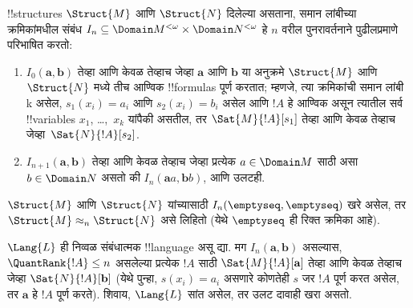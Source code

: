 \documentclass[../../../include/open-logic-section]{subfiles}
\begin{document}
\begin{defn}
  !!{structure}s $\Struct{M}$ आणि $\Struct{N}$ दिलेल्या असताना, समान
  लांबीच्या क्रमिकांमधील संबंध $I_n \subseteq \Domain M^{<\omega}
  \times \Domain N^{<\omega}$ हे $n$ वरील पुनरावर्तनाने पुढीलप्रमाणे
  परिभाषित करतो:
   \begin{enumerate}
   \item $I_0(\mathbf{a},\mathbf{b})$ तेव्हा आणि केवळ तेव्हाच जेव्हा
     $\mathbf{a}$ आणि $\mathbf{b}$ या अनुक्रमे $\Struct{M}$ आणि
     $\Struct{N}$ मध्ये तीच आण्विक !!{formula}s पूर्ण करतात; म्हणजे,
     त्या क्रमिकांची समान लांबी k असेल, $s_1(x_i) = a_i$ आणि $s_2(x_i) =
     b_i$ असेल आणि $!A$ हे आण्विक असून त्यातील सर्व !!{variable}s
     $x_1$, \dots,~$x_k$ यांपैकी असतील, तर $\Sat{M}{!A}[s_1]$ तेव्हा आणि
     केवळ तेव्हाच जेव्हा~$\Sat{N}{!A}[s_2]$.
   \item $I_{n+1} (\mathbf{a},\mathbf{b})$ तेव्हा आणि केवळ तेव्हाच
     जेव्हा प्रत्येक $a\in \Domain M$ साठी असा $b\in \Domain N$ असतो की
     $I_n (\mathbf{a}a,\mathbf{b}b)$, आणि उलटही.
   \end{enumerate}
\end{defn}


\begin{defn}
  $\Struct{M}$ आणि $\Struct{N}$ यांच्यासाठी
  $I_n(\emptyseq,\emptyseq)$ खरे असेल, तर $\Struct{M} \approx_n
  \Struct{N}$ असे लिहितो (येथे $\emptyseq$ ही रिक्त क्रमिका आहे).
\end{defn}

\begin{thm}
  $\Lang{L}$ ही निव्वळ संबंधात्मक !!{language} असू द्या. मग
  $I_n (\mathbf{a},\mathbf{b})$ असल्यास, $\QuantRank{!A} \le n$ असलेल्या
  प्रत्येक $!A$ साठी $\Sat{M}{!A}[\mathbf{a}]$ तेव्हा आणि केवळ तेव्हाच
  जेव्हा $\Sat{N}{!A}[\mathbf{b}]$ (येथे पुन्हा, $s(x_i) = a_i$ असणारे
  कोणतेही $s$ जर $!A$ पूर्ण करत असेल, तर $\mathbf{a}$ हे $!A$ पूर्ण
  करते). शिवाय, $\Lang{L}$ सांत असेल, तर उलट दावाही खरा असतो.
\end{thm}
\end{document}
